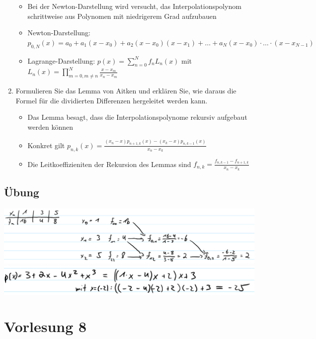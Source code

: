 \documentclass[]{article}
\begin{document}
\begin{enumerate}
			\begin{itemize}
				\item Bei der Newton-Darstellung wird versucht, das Interpolationspolynom schrittweise aus Polynomen mit niedrigerem Grad aufzubauen
				\item Newton-Darstellung: $p_{0,N}(x) = a_0 + a_1(x - x_0) + a_2(x - x_0)(x - x_1) + \dots + a_N(x-x_0) \cdot \dots \cdot (x-x_{N-1})$
				\item Lagrange-Darstellung: $p(x) = \sum_{n=0}^{N} f_n L_n(x)$ mit $L_n(x) = \prod_{m=0, m \neq n}^{N} \frac{x-x_m}{x_n - x_m}$
			\end{itemize}
		\item Formulieren Sie das Lemma von Aitken und erklären Sie, wie daraus die Formel für die dividierten Differenzen hergeleitet werden kann.
			\begin{itemize}
				\item Das Lemma besagt, dass die Interpolationspolynome rekursiv aufgebaut werden können
                \item Konkret gilt $p_{n,k}(x) = \frac{(x_n-x)p_{n + 1, k}(x) - (x_k - x) p_{n, k - 1}(x)}{x_n - x_k}$
				\item Die Leitkoeffizieniten der Rekursion des Lemmas sind $f_{n,k} = \frac{f_{n,k-1} - f_{n+1,k}}{x_n - x_k}$
			\end{itemize}
	\end{enumerate}
\subsection{Übung}
	\includegraphics[width=\textwidth]{res/vl7-1.png}
	\includegraphics[width=\textwidth]{res/vl7-2.png}	

\section{Vorlesung 8}
\end{document}
